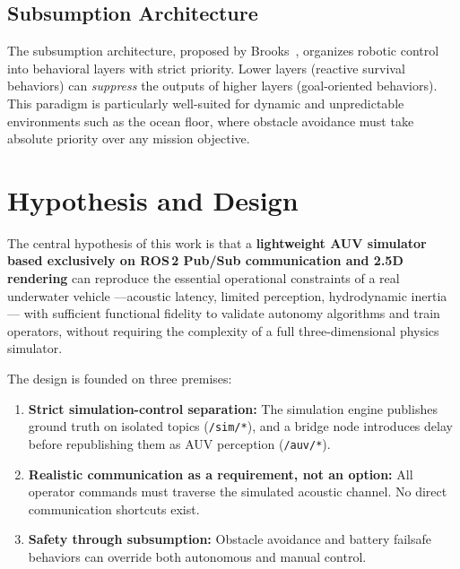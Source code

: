 \documentclass[10pt,twocolumn,letterpaper]{article}
\begin{document}
\subsection{Subsumption Architecture}

The subsumption architecture, proposed by Brooks~\cite{brooks1986}, organizes robotic control into behavioral layers with strict priority. Lower layers (reactive survival behaviors) can \textit{suppress} the outputs of higher layers (goal-oriented behaviors). This paradigm is particularly well-suited for dynamic and unpredictable environments such as the ocean floor, where obstacle avoidance must take absolute priority over any mission objective.

\section{Hypothesis and Design}
\label{sec:hypothesis}

The central hypothesis of this work is that a \textbf{lightweight AUV simulator based exclusively on ROS\,2 Pub/Sub communication and 2.5D rendering} can reproduce the essential operational constraints of a real underwater vehicle ---acoustic latency, limited perception, hydrodynamic inertia--- with sufficient functional fidelity to validate autonomy algorithms and train operators, without requiring the complexity of a full three-dimensional physics simulator.

The design is founded on three premises:

\begin{enumerate}[leftmargin=*,itemsep=2pt]
    \item \textbf{Strict simulation-control separation:} The simulation engine publishes ground truth on isolated topics (\texttt{/sim/*}), and a bridge node introduces delay before republishing them as AUV perception (\texttt{/auv/*}).
    \item \textbf{Realistic communication as a requirement, not an option:} All operator commands must traverse the simulated acoustic channel. No direct communication shortcuts exist.
    \item \textbf{Safety through subsumption:} Obstacle avoidance and battery failsafe behaviors can override both autonomous and manual control.
\end{enumerate}

\end{document}
